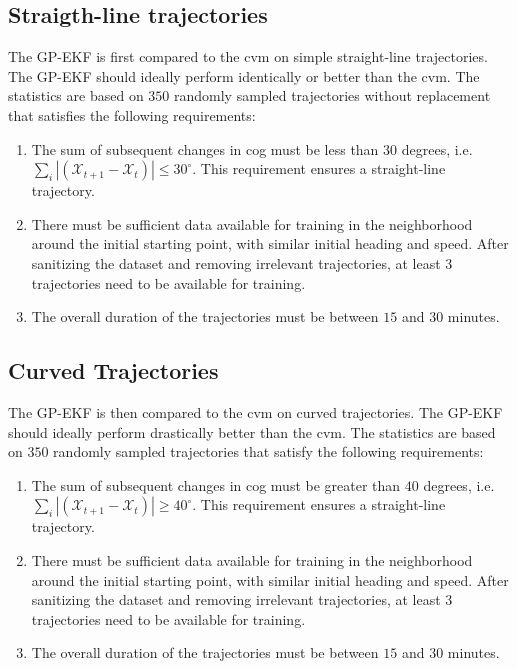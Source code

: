 \subsection{Straigth-line trajectories}
The GP-EKF is first compared to the \acrshort{cvm} on simple straight-line trajectories. The GP-EKF should ideally perform identically or better than the \acrshort{cvm}.
The statistics are based on $350$ randomly sampled trajectories without replacement that satisfies the following requirements:
\begin{enumerate}
    \item The sum of subsequent changes in \acrshort{cog} must be less than $30$ degrees, i.e. $\sum_i |(\mathcal{X}_{t+1} - \mathcal{X}_t)| \leq 30^\circ$. This requirement ensures a straight-line trajectory.
    \item There must be sufficient data available for training in the neighborhood around the initial starting point, with similar initial heading and speed. After sanitizing the dataset and removing irrelevant trajectories, at least $3$ trajectories need to be available for training.
    \item The overall duration of the trajectories must be between $15$ and $30$ minutes.
\end{enumerate}




\subsection{Curved Trajectories}
The GP-EKF is then compared to the \acrshort{cvm} on curved trajectories. The GP-EKF should ideally perform drastically better than the \acrshort{cvm}.
The statistics are based on $350$ randomly sampled trajectories that satisfy the following requirements:
\begin{enumerate}
    \item The sum of subsequent changes in \acrshort{cog} must be greater than $40$ degrees, i.e. $\sum_i |(\mathcal{X}_{t+1} - \mathcal{X}_t)| \geq 40^\circ$. This requirement ensures a straight-line trajectory.
    \item There must be sufficient data available for training in the neighborhood around the initial starting point, with similar initial heading and speed. After sanitizing the dataset and removing irrelevant trajectories, at least $3$ trajectories need to be available for training.
    \item The overall duration of the trajectories must be between $15$ and $30$ minutes.
\end{enumerate}


